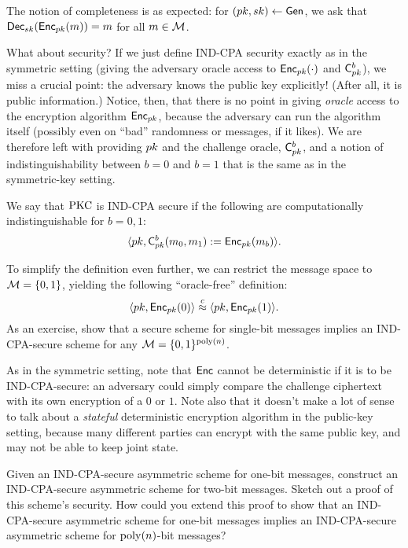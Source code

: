 \documentclass[11pt]{article}
\begin{document}
The notion of completeness is as expected: for $(pk, sk) \gets
\mathsf{Gen}$, we ask that $\mathsf{Dec}_{sk}(\mathsf{Enc}_{pk}(m)) = m$ for all $m
\in \mathcal{M}$.

What about security?  If we just define IND-CPA security exactly as in
the symmetric setting (giving the adversary oracle access to
$\mathsf{Enc}_{pk}(\cdot)$ and $\mathsf{C}_{pk}^{b}$), we miss a crucial
point: the adversary knows the public key explicitly!  (After all, it
is public information.)  Notice, then, that there is no point in
giving \emph{oracle} access to the encryption algorithm
$\mathsf{Enc}_{pk}$, because the adversary can run the algorithm itself
(possibly even on ``bad'' randomness or messages, if it likes).  We
are therefore left with providing $pk$ and the challenge oracle,
$\mathsf{C}_{pk}^{b}$, and a notion of indistinguishability between $b
= 0$ and $b = 1$ that is the same as in the symmetric-key setting.

\begin{definition}
  \label{def:ind-cpa-pkc}
  We say that $\text{PKC}$ is IND-CPA secure if the following are
  computationally indistinguishable for $b = 0,1$: \[ \langle pk,
  \mathsf{C}^{b}_{pk}(m_{0}, m_{1}) := \mathsf{Enc}_{pk}(m_{b})
  \rangle. \]
\end{definition}

To simplify the definition even further, we can restrict the message
space to $\mathcal{M} = \{0,1\}$, yielding the following ``oracle-free''
definition:
\[ \langle pk, \mathsf{Enc}_{pk}(0) \rangle \stackrel{c}{\approx} \langle pk,
\mathsf{Enc}_{pk}(1) \rangle. \] As an exercise, show that a secure scheme
for single-bit messages implies an IND-CPA-secure scheme for any
$\mathcal{M} = \{0,1\}^{\operatorname{poly}(n)}$.

As in the symmetric setting, note that $\mathsf{Enc}$ cannot be
deterministic if it is to be IND-CPA-secure: an adversary could simply
compare the challenge ciphertext with its own encryption of a $0$ or
$1$.  Note also that it doesn't make a lot of sense to talk about a
\emph{stateful} deterministic encryption algorithm in the public-key
setting, because many different parties can encrypt with the same
public key, and may not be able to keep joint state.

\begin{question}
  Given an IND-CPA-secure asymmetric scheme for one-bit messages,
  construct an IND-CPA-secure asymmetric scheme for two-bit
  messages. Sketch out a proof of this scheme's security. How could
  you extend this proof to show that an IND-CPA-secure asymmetric
  scheme for one-bit messages implies an IND-CPA-secure asymmetric
  scheme for \(\operatorname{poly}(n)\)-bit messages?
\end{question}
\end{document}
